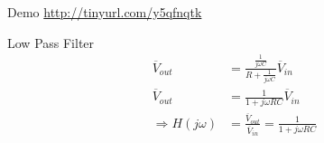 \documentclass[aspectratio=169]{beamer}
\begin{document}
\begin{frame}{Demo}
    \Huge\url{http://tinyurl.com/y5qfnqtk}
\end{frame}

\begin{frame}{Low Pass Filter}
    \begin{align}
        \overline{V}_{out} &= \frac{\frac{1}{j \omega C}}{R + \frac{1}{j \omega C}} \overline{V}_{in} \\
        \overline{V}_{out} &= \frac{1}{1 + j \omega RC} \overline{V}_{in} \\
        \Rightarrow H(j \omega) &= \frac{\overline{V}_{out}}{\overline{V}_{in}} = \frac{1}{1 + j \omega RC}
    \end{align}
\end{frame}
\end{document}
